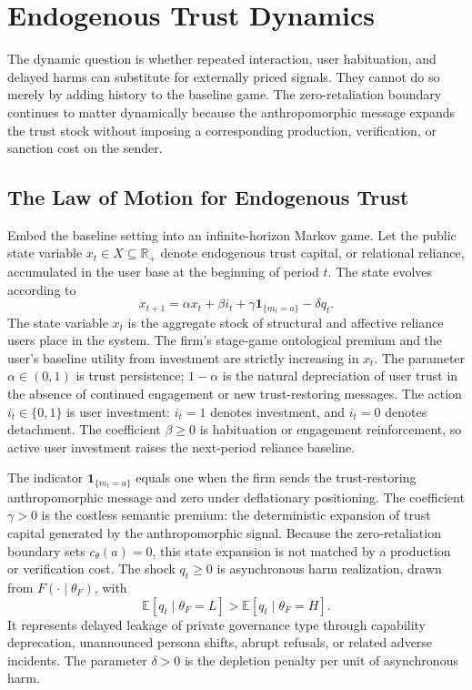 \documentclass[preprint,authoryear]{elsarticle}
\theoremstyle{definition}
\theoremstyle{plain}
\begin{document}
\section{Endogenous Trust Dynamics}
\label{sec:trust-dynamics}

The dynamic question is whether repeated interaction, user habituation, and
delayed harms can substitute for externally priced signals.  They cannot do so
merely by adding history to the baseline game.  The zero-retaliation boundary
continues to matter dynamically because the anthropomorphic message expands
the trust stock without imposing a corresponding production, verification, or
sanction cost on the sender.

\subsection{The Law of Motion for Endogenous Trust}
\label{subsec:trust-law}

Embed the baseline setting into an infinite-horizon Markov game.  Let the
public state variable $x_t\in X\subseteq\mathbb R_+$ denote endogenous trust
capital, or relational reliance, accumulated in the user base at the beginning
of period $t$.  The state evolves according to
\[
x_{t+1}
=
\alpha x_t+\beta i_t+\gamma\mathbf 1_{\{m_t=a\}}-\delta q_t .
\]
The state variable $x_t$ is the aggregate stock of structural and affective
reliance users place in the system.  The firm's stage-game ontological premium
and the user's baseline utility from investment are strictly increasing in
$x_t$.  The parameter $\alpha\in(0,1)$ is trust persistence; $1-\alpha$ is the
natural depreciation of user trust in the absence of continued engagement or
new trust-restoring messages.  The action $i_t\in\{0,1\}$ is user investment:
$i_t=1$ denotes investment, and $i_t=0$ denotes detachment.  The coefficient
$\beta\ge0$ is habituation or engagement reinforcement, so active user
investment raises the next-period reliance baseline.

The indicator $\mathbf 1_{\{m_t=a\}}$ equals one when the firm sends the
trust-restoring anthropomorphic message and zero under deflationary
positioning.  The coefficient $\gamma>0$ is the costless semantic premium: the
deterministic expansion of trust capital generated by the anthropomorphic
signal.  Because the zero-retaliation boundary sets $c_\theta(a)=0$, this
state expansion is not matched by a production or verification cost.  The shock
$q_t\ge0$ is asynchronous harm realization, drawn from
$F(\cdot\mid\theta_F)$, with
\[
\mathbb E[q_t\mid\theta_F=L]>\mathbb E[q_t\mid\theta_F=H].
\]
It represents delayed leakage of private governance type through capability
deprecation, unannounced persona shifts, abrupt refusals, or related adverse
incidents.  The parameter $\delta>0$ is the depletion penalty per unit of
asynchronous harm.
\end{document}
